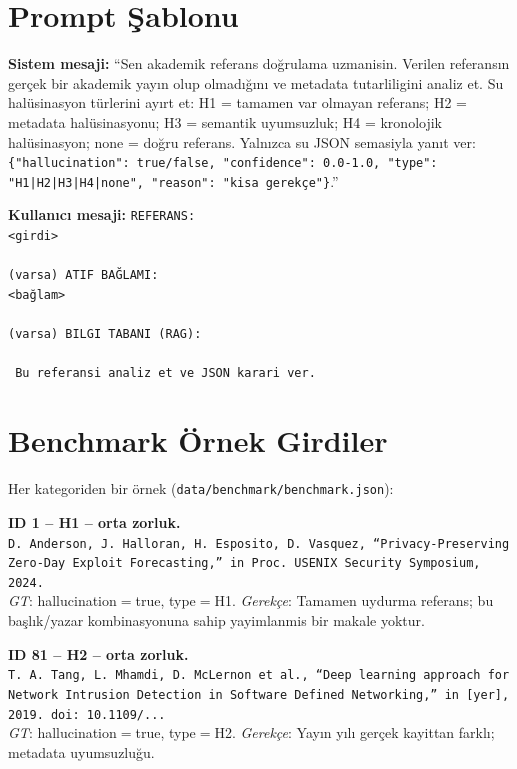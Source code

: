 \documentclass[11pt,a4paper]{article}
\begin{document}
\section{Prompt Şablonu}
\label{appx:prompt}
\textbf{Sistem mesaji:} ``Sen akademik referans doğrulama uzmanisin. Verilen
referansın gerçek bir akademik yayın olup olmadığını ve metadata tutarliligini
analiz et. Su halüsinasyon türlerini ayırt et: H1 = tamamen var olmayan
referans; H2 = metadata halüsinasyonu; H3 = semantik uyumsuzluk;
H4 = kronolojik halüsinasyon; none = doğru referans. Yalnızca su JSON
semasiyla yanıt ver:
\texttt{\{"hallucination": true/false, "confidence": 0.0-1.0,
"type": "H1|H2|H3|H4|none", "reason": "kisa gerekçe"\}}.''

\noindent\textbf{Kullanıcı mesaji:} \texttt{REFERANS:\\<girdi>\\\\(varsa)\
ATIF BAĞLAMI:\\<bağlam>\\\\(varsa)\ BILGI TABANI (RAG):\\<getirilen kayıtlar>\\\
Bu referansi analiz et ve JSON karari ver.}

\section{Benchmark Örnek Girdiler}
\label{appx:benchmark}
Her kategoriden bir örnek (\texttt{data/benchmark/benchmark.json}):

\noindent\textbf{ID 1 -- H1 -- orta zorluk.}\\
\texttt{D. Anderson, J. Halloran, H. Esposito, D. Vasquez, ``Privacy-Preserving Zero-Day Exploit Forecasting,'' in Proc.\ USENIX Security Symposium, 2024.}\\
\textit{GT}: hallucination$=$true, type$=$H1.
\textit{Gerekçe}: Tamamen uydurma referans; bu başlık/yazar kombinasyonuna
sahip yayimlanmis bir makale yoktur.

\medskip
\noindent\textbf{ID 81 -- H2 -- orta zorluk.}\\
\texttt{T.~A.~Tang, L.~Mhamdi, D.~McLernon et al., ``Deep learning approach for Network Intrusion Detection in Software Defined Networking,'' in [yer], 2019. doi: 10.1109/...}\\
\textit{GT}: hallucination$=$true, type$=$H2.
\textit{Gerekçe}: Yayın yılı gerçek kayittan farklı; metadata uyumsuzluğu.
\end{document}
